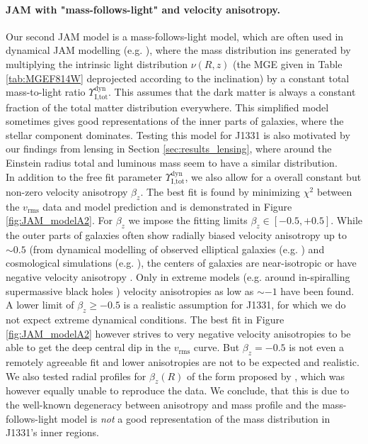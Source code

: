 \paragraph{JAM with "mass-follows-light" and velocity anisotropy.} Our second JAM model is a mass-follows-light model, which are often used in dynamical JAM modelling (e.g. \citet{GlennEC,Cap06}), where the mass distribution ins generated by multiplying the intrinsic light distribution $\nu(R,z)$ (the MGE given in Table \ref{tab:MGEF814W} deprojected according to the inclination) by a constant total mass-to-light ratio  $\Upsilon_\text{I,tot}^\text{dyn}$. This assumes that the dark matter is always a constant fraction of the total matter distribution everywhere. This simplified model sometimes gives good representations of the inner parts of galaxies, where the stellar component dominates. Testing this model for J1331 is also motivated by our findings from lensing in Section \ref{sec:results_lensing}, where around the Einstein radius total and luminous mass seem to have a similar distribution.
\\In addition to the free fit parameter  $\Upsilon_\text{I,tot}^\text{dyn}$, we also allow for a overall constant but non-zero velocity anisotropy $\beta_z$. The best fit is found by minimizing $\chi^2$ between the $v_\text{rms}$ data and model prediction and is demonstrated in Figure \ref{fig:JAM_modelA2}. For $\beta_z$ we impose the fitting limits $\beta_z \in [-0.5,+0.5]$. While the outer parts of galaxies often show radially biased velocity anisotropy up to $\sim 0.5$ (from dynamical modelling of observed elliptical galaxies (e.g. \citet{Kronawitter2000}) and cosmological simulations (e.g. \citet{2004MNRAS.352..535D,2001ApJ...557..533F}), the centers of galaxies are near-isotropic or have  negative velocity anisotropy \citep{2003ApJ...583...92G}. Only in extreme models (e.g. around in-spiralling supermassive black holes \citep{1997NewA....2..533Q}) velocity anisotropies as low as $\sim -1$ have been found. A lower limit of $\beta_z \geq -0.5$ is a realistic assumption for J1331, for which we do not expect extreme dynamical conditions. The best fit in Figure \ref{fig:JAM_modelA2} however strives to very negative velocity anisotropies to be able to get the deep central dip in the  $v_\text{rms}$ curve. But $\beta_z = -0.5$ is not even a remotely agreeable fit and lower anisotropies are not to be expected and realistic. We also tested radial profiles for $\beta_z(R)$ of the form proposed by \citet{BaesVanHese}, which was however equally unable to reproduce the data. We conclude, that this is due to the well-known degeneracy between anisotropy and mass profile \Wilma{[TO DO: REF]} and the mass-follows-light model is \emph{not} a good representation of the mass distribution in J1331's inner regions.


